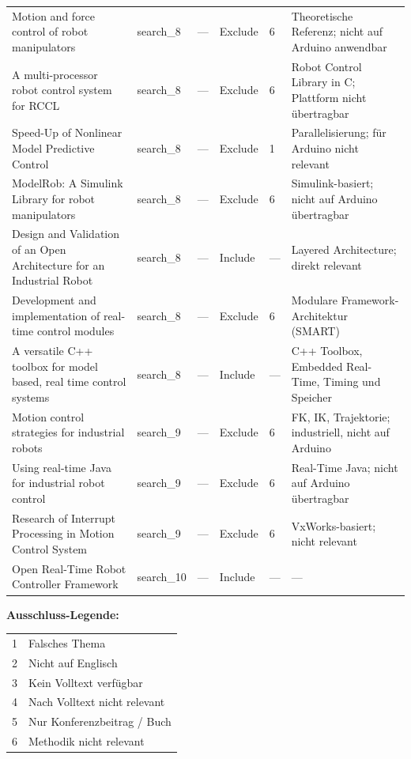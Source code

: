 \documentclass[12pt,a4paper]{article}
\begin{document}
\begin{landscape}
\begin{longtable}{p{5.5cm} l l l l p{5.5cm}}
Motion and force control of robot manipulators
  & search\_8 & — & Exclude & 6 & Theoretische Referenz; nicht auf Arduino anwendbar \\
\addlinespace
A multi-processor robot control system for RCCL
  & search\_8 & — & Exclude & 6 & Robot Control Library in C; Plattform nicht übertragbar \\
\addlinespace
Speed-Up of Nonlinear Model Predictive Control
  & search\_8 & — & Exclude & 1 & Parallelisierung; für Arduino nicht relevant \\
\addlinespace
ModelRob: A Simulink Library for robot manipulators
  & search\_8 & — & Exclude & 6 & Simulink-basiert; nicht auf Arduino übertragbar \\
\addlinespace
Design and Validation of an Open Architecture for an Industrial Robot
  & search\_8 & — & Include & — & Layered Architecture; direkt relevant \\
\addlinespace
Development and implementation of real-time control modules
  & search\_8 & — & Exclude & 6 & Modulare Framework-Architektur (SMART) \\
\addlinespace
A versatile C++ toolbox for model based, real time control systems
  & search\_8 & — & Include & — & C++ Toolbox, Embedded Real-Time, Timing und Speicher \\
\addlinespace
Motion control strategies for industrial robots
  & search\_9 & — & Exclude & 6 & FK, IK, Trajektorie; industriell, nicht auf Arduino \\
\addlinespace
Using real-time Java for industrial robot control
  & search\_9 & — & Exclude & 6 & Real-Time Java; nicht auf Arduino übertragbar \\
\addlinespace
Research of Interrupt Processing in Motion Control System
  & search\_9 & — & Exclude & 6 & VxWorks-basiert; nicht relevant \\
\addlinespace
Open Real-Time Robot Controller Framework
  & search\_10 & — & Include & — & — \\
\end{longtable}

\newpage
\vspace{1em}
\noindent\textbf{Ausschluss-Legende:}\\[0.3em]
\begin{tabular}{ll}
1 & Falsches Thema \\
2 & Nicht auf Englisch \\
3 & Kein Volltext verfügbar \\
4 & Nach Volltext nicht relevant \\
5 & Nur Konferenzbeitrag / Buch \\
6 & Methodik nicht relevant \\
\end{tabular}

\end{landscape}
\end{document}
